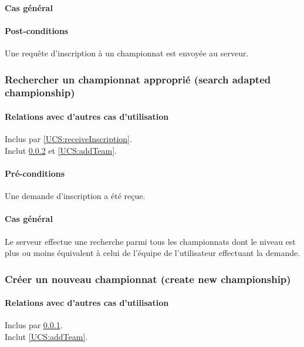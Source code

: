 \paragraph{Cas général}
\paragraph{Post-conditions}
\begin{list}{}{\leftmargin=1.5em}
\item{Une requête d'inscription à un championnat est envoyée au serveur.}
\end{list}

\subsubsection{Rechercher un championnat approprié (search adapted championship)}
\label{UCS:searchChampionship}
\paragraph{Relations avec d'autres cas d'utilisation}
Inclus par \ref{UCS:receiveInscription}.\\
Inclut \ref{UCS:createChampionship} et \ref{UCS:addTeam}.
\paragraph{Pré-conditions}
\begin{list}{}{\leftmargin=1.5em}
\item{Une demande d'inscription a été reçue.}
\end{list}
\paragraph{Cas général}
Le serveur effectue une recherche parmi tous les championnats dont le niveau est plus ou moins équivalent à celui de l'équipe de l'utilisateur effectuant la demande.

\subsubsection{Créer un nouveau championnat (create new championship)}
\label{UCS:createChampionship}
\paragraph{Relations avec d'autres cas d'utilisation}
Inclus par \ref{UCS:searchChampionship}.\\
Inclut \ref{UCS:addTeam}.
